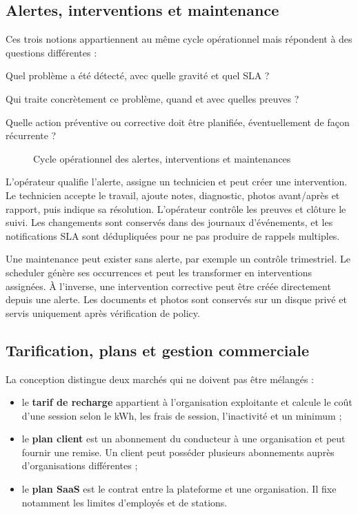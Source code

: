 \subsection{Alertes, interventions et maintenance}

Ces trois notions appartiennent au même cycle opérationnel mais répondent à des
questions différentes :

\begin{description}[leftmargin=31mm,style=nextline]
  \item[Alerte] Quel problème a été détecté, avec quelle gravité et quel SLA ?
  \item[Intervention] Qui traite concrètement ce problème, quand et avec quelles
  preuves ?
  \item[Maintenance] Quelle action préventive ou corrective doit être planifiée,
  éventuellement de façon récurrente ?
\end{description}

\begin{figure}[H]
  \centering
  \resizebox{0.96\textwidth}{!}{}
  \caption{Cycle opérationnel des alertes, interventions et maintenances}
  \label{fig:operations-lifecycle}
\end{figure}

L'opérateur qualifie l'alerte, assigne un technicien et peut créer une intervention.
Le technicien accepte le travail, ajoute notes, diagnostic, photos avant/après et
rapport, puis indique sa résolution. L'opérateur contrôle les preuves et clôture le
suivi. Les changements sont conservés dans des journaux d'événements, et les
notifications SLA sont dédupliquées pour ne pas produire de rappels multiples.

Une maintenance peut exister sans alerte, par exemple un contrôle trimestriel. Le
scheduler génère ses occurrences et peut les transformer en interventions
assignées. À l'inverse, une intervention corrective peut être créée directement
depuis une alerte. Les documents et photos sont conservés sur un disque privé et
servis uniquement après vérification de policy.

\subsection{Tarification, plans et gestion commerciale}

La conception distingue deux marchés qui ne doivent pas être mélangés :

\begin{itemize}[leftmargin=7mm]
  \item le \textbf{tarif de recharge} appartient à l'organisation exploitante et
  calcule le coût d'une session selon le kWh, les frais de session, l'inactivité et
  un minimum ;
  \item le \textbf{plan client} est un abonnement du conducteur à une organisation
  et peut fournir une remise. Un client peut posséder plusieurs abonnements auprès
  d'organisations différentes ;
  \item le \textbf{plan SaaS} est le contrat entre la plateforme et une organisation.
  Il fixe notamment les limites d'employés et de stations.
\end{itemize}

